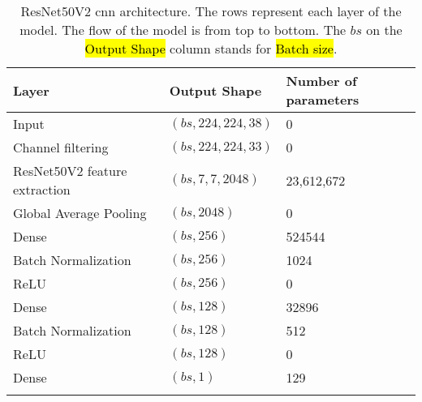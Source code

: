 \begin{longtable}{m{\mylengtha} | m{\mylengthb} | m{\mylengthc}}
    \hline
    Layer & Output Shape & Number of parameters \\
    \hline
    Input & $(bs, 224, 224, 38)$ & 0 \\
    \hline
    Channel filtering & $(bs, 224, 224, 33)$ & 0 \\
    \hline
    ResNet50V2 feature extraction & $(bs, 7, 7, 2048)$ & 23,612,672 \\
    \hline
    Global Average Pooling & $(bs, 2048)$ & 0 \\
    \hline
    Dense & $(bs, 256)$ & 524544 \\
    \hline
    Batch Normalization & $(bs, 256)$ & 1024 \\
    \hline
    ReLU & $(bs, 256)$ & 0 \\
    \hline
    Dense & $(bs, 128)$ & 32896 \\
    \hline
    Batch Normalization & $(bs, 128)$ & 512 \\
    \hline
    ReLU & $(bs, 128)$ & 0 \\
    \hline
    Dense & $(bs, 1)$ & 129 \\
    \hline
  \caption{ResNet50V2 \gls{cnn} architecture. The rows represent each layer of the model. The flow of the model is from top to bottom. The $bs$ on the \hl{Output Shape} column stands for \hl{Batch size}.}
  \label{table:metho:models:RN50V2}
\end{longtable}
